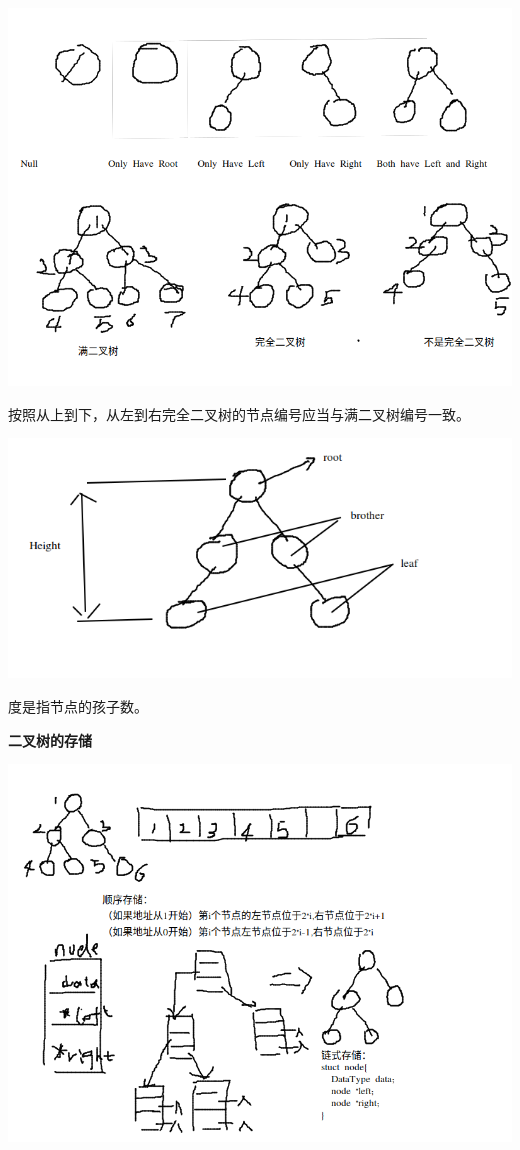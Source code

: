 \documentclass{article}
\begin{document}
	\includegraphics[scale=0.4]{./pic/tree-02.png}

	按照从上到下，从左到右完全二叉树的节点编号应当与满二叉树编号一致。

	\includegraphics[scale=0.4]{./pic/tree-02-1.png}

	度是指节点的孩子数。

	\textbf{二叉树的存储}

	\includegraphics[scale=0.4]{./pic/tree-03.png}
\end{document}
